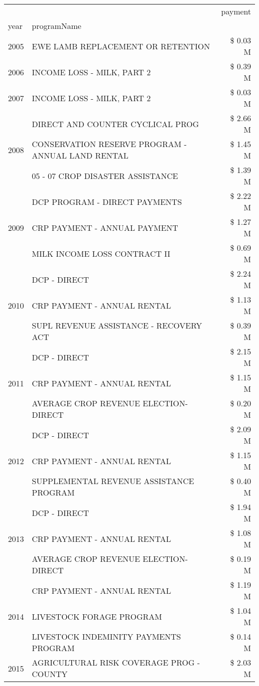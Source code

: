 \begin{tabular}{llr}
\toprule
 &  & payment \\
year & programName &  \\
\midrule
2005 & EWE LAMB REPLACEMENT OR RETENTION & \$ 0.03 M \\
\cline{1-3}
2006 & INCOME LOSS - MILK, PART 2 & \$ 0.39 M \\
\cline{1-3}
2007 & INCOME LOSS - MILK, PART 2 & \$ 0.03 M \\
\cline{1-3}
\multirow[t]{3}{*}{2008} & DIRECT AND COUNTER CYCLICAL PROG & \$ 2.66 M \\
 & CONSERVATION RESERVE PROGRAM - ANNUAL LAND RENTAL & \$ 1.45 M \\
 & 05 - 07 CROP DISASTER ASSISTANCE & \$ 1.39 M \\
\cline{1-3}
\multirow[t]{3}{*}{2009} & DCP PROGRAM - DIRECT PAYMENTS & \$ 2.22 M \\
 & CRP PAYMENT - ANNUAL PAYMENT & \$ 1.27 M \\
 & MILK INCOME LOSS CONTRACT II & \$ 0.69 M \\
\cline{1-3}
\multirow[t]{3}{*}{2010} & DCP - DIRECT & \$ 2.24 M \\
 & CRP PAYMENT - ANNUAL RENTAL & \$ 1.13 M \\
 & SUPL REVENUE ASSISTANCE - RECOVERY ACT & \$ 0.39 M \\
\cline{1-3}
\multirow[t]{3}{*}{2011} & DCP - DIRECT & \$ 2.15 M \\
 & CRP PAYMENT - ANNUAL RENTAL & \$ 1.15 M \\
 & AVERAGE CROP REVENUE ELECTION-DIRECT & \$ 0.20 M \\
\cline{1-3}
\multirow[t]{3}{*}{2012} & DCP - DIRECT & \$ 2.09 M \\
 & CRP PAYMENT - ANNUAL RENTAL & \$ 1.15 M \\
 & SUPPLEMENTAL REVENUE ASSISTANCE PROGRAM & \$ 0.40 M \\
\cline{1-3}
\multirow[t]{3}{*}{2013} & DCP - DIRECT & \$ 1.94 M \\
 & CRP PAYMENT - ANNUAL RENTAL & \$ 1.08 M \\
 & AVERAGE CROP REVENUE ELECTION-DIRECT & \$ 0.19 M \\
\cline{1-3}
\multirow[t]{3}{*}{2014} & CRP PAYMENT - ANNUAL RENTAL & \$ 1.19 M \\
 & LIVESTOCK FORAGE PROGRAM & \$ 1.04 M \\
 & LIVESTOCK INDEMINITY PAYMENTS PROGRAM & \$ 0.14 M \\
\cline{1-3}
\multirow[t]{3}{*}{2015} & AGRICULTURAL RISK COVERAGE PROG - COUNTY & \$ 2.03 M \\

\end{tabular}
